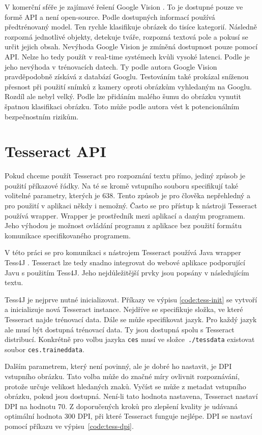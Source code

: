 \documentclass[thesis=B,czech]{FITthesis}[2019/12/23]
\begin{document}
V komerční sféře je zajímavé řešení Google Vision \cite{gvision}. To je dostupné pouze ve formě API a není open-source. Podle dostupných informací používá předtrénovaný model. Ten rychle klasifikuje obrázek do tisíce kategorií. Následně rozpozná jednotlivé objekty, detekuje tváře, rozpozná textová pole a pokusí se určit jejich obsah. Nevýhoda Google Vision je zmíněná dostupnost pouze pomocí API. Nelze ho tedy použít v real-time systémech kvůli vysoké latenci. Podle  \cite{gvisionLopez2019} je jeho nevýhoda v trénovacích datech. Ty podle autora Google Vision pravděpodobně získává z databází Googlu. Testováním také prokázal sníženou přesnost při použití snímků z kamery oproti obrázkům vyhledaným na Googlu. Rozdíl ale nebyl velký. Podle  \cite{Hosseini2017} lze přidáním malého šumu do obrázku vynutit špatnou klasifikaci obrázku. Toto může podle autora vést k potencionálním bezpečnostním rizikům.

\section{Tesseract API}
Pokud chceme použít Tesseract pro rozpoznání textu přímo, jediný způsob je použití příkazové řádky. Na té se kromě vstupního souboru specifikují také volitelné parametry, kterých je 638. Tento způsob je pro člověka nepřehledný a pro použití v aplikaci někdy i nemožný. Často se pro přístup k nástroji Tesseract používá wrapper. Wrapper je prostředník mezi aplikací a daným programem. Jeho výhodou je možnost ovládání programu z aplikace bez použití formátu komunikace specifikovaného programem.

V této práci se pro komunikaci s nástrojem Tesseract používá Java wrapper Tess4J \cite{tess4j}. Tesseract lze tedy snadno integrovat do webové aplikace podporující Javu s použitím Tess4J. Jeho nejdůležitější prvky jsou popsány v následujícím textu.

Tess4J je nejprve nutné inicializovat. Příkazy ve výpisu \ref{code:tess-init} se vytvoří a inicializuje nová Tesseract instance. Nejdříve se specifikuje složka, ve které Tesseract najde trénovací data. Dále se může specifikovat jazyk. Pro každý jazyk ale musí být dostupná trénovací data. Ty jsou dostupná spolu s Tesseract distribucí. Konkrétně pro volbu jazyka \texttt{ces} musí ve složce~\texttt{./tessdata} existovat soubor \texttt{ces.traineddata}.

Dalším parametrem, který není povinný, ale je dobré ho nastavit, je DPI vstupního obrázku. Tato volba může do značné míry ovlivnit rozpoznávání, protože určuje velikost hledaných znaků. Vyčíst se může z metadat vstupního obrázku, pokud jsou dostupná. Není-li tato hodnota nastavena, Tesseract nastaví DPI na hodnotu 70. Z doporučených kroků pro zlepšení kvality \cite{ImprovingQualityOutput2020} je udávaná optimální hodnota 300 DPI, při které Tesseract funguje nejlépe. DPI se nastaví pomocí příkazu ve výpisu~\ref{code:tess-dpi}.
\end{document}
